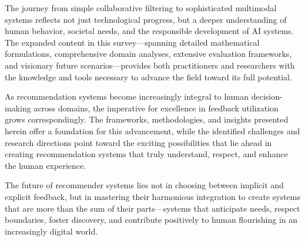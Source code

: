 \documentclass[acmsmall,review,anonymous]{acmart}
\begin{document}
The journey from simple collaborative filtering to sophisticated multimodal systems reflects not just technological progress, but a deeper understanding of human behavior, societal needs, and the responsible development of AI systems. The expanded content in this survey—spanning detailed mathematical formulations, comprehensive domain analyses, extensive evaluation frameworks, and visionary future scenarios—provides both practitioners and researchers with the knowledge and tools necessary to advance the field toward its full potential.

As recommendation systems become increasingly integral to human decision-making across domains, the imperative for excellence in feedback utilization grows correspondingly. The frameworks, methodologies, and insights presented herein offer a foundation for this advancement, while the identified challenges and research directions point toward the exciting possibilities that lie ahead in creating recommendation systems that truly understand, respect, and enhance the human experience.

The future of recommender systems lies not in choosing between implicit and explicit feedback, but in mastering their harmonious integration to create systems that are more than the sum of their parts—systems that anticipate needs, respect boundaries, foster discovery, and contribute positively to human flourishing in an increasingly digital world.



\end{document}
